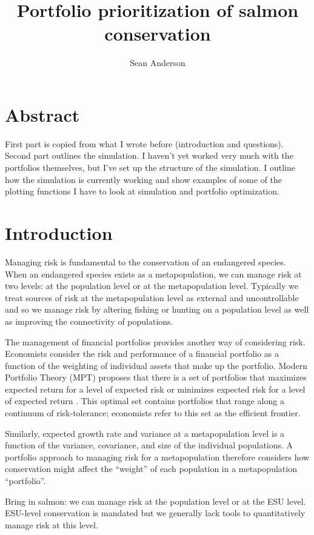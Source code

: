 \documentclass[12pt]{article}
\title{Portfolio prioritization of salmon conservation}
\author{Sean Anderson}
\date{}
\begin{document}
\maketitle

\section{Abstract}

First part is copied from what I wrote before (introduction and
questions). Second part outlines the simulation. I haven't yet worked
very much with the portfolios themselves, but I've set up the structure
of the simulation. I outline how the simulation is currently working and
show examples of some of the plotting functions I have to look at
simulation and portfolio optimization.

\section{Introduction}

Managing risk is fundamental to the conservation of an endangered
species. When an endangered species exists as a metapopulation, we can
manage risk at two levels: at the population level or at the
metapopulation level. Typically we treat sources of risk at the
metapopulation level as external and uncontrollable and so we manage
risk by altering fishing or hunting on a population level as well as
improving the connectivity of populations.

The management of financial portfolios provides another way of
considering risk. Economists consider the risk and performance of a
financial portfolio as a function of the weighting of individual assets
that make up the portfolio. Modern Portfolio Theory (MPT) proposes that
there is a set of portfolios that maximizes expected return for a level
of expected risk or minimizes expected risk for a level of expected
return \citep{Markowitz1952, Markowitz1959}. This optimal set contains
portfolios that range along a continuum of risk-tolerance; economists
refer to this set as the efficient frontier.

Similarly, expected growth rate and variance at a metapopulation level
is a function of the variance, covariance, and size of the individual
populations. A portfolio approach to managing risk for a metapopulation
therefore considers how conservation might affect the ``weight'' of each
population in a metapopulation ``portfolio''.

Bring in salmon: we can manage risk at the population level or at the
ESU level. ESU-level conservation is mandated but we generally lack
tools to quantitatively manage risk at this level.
\end{document}
